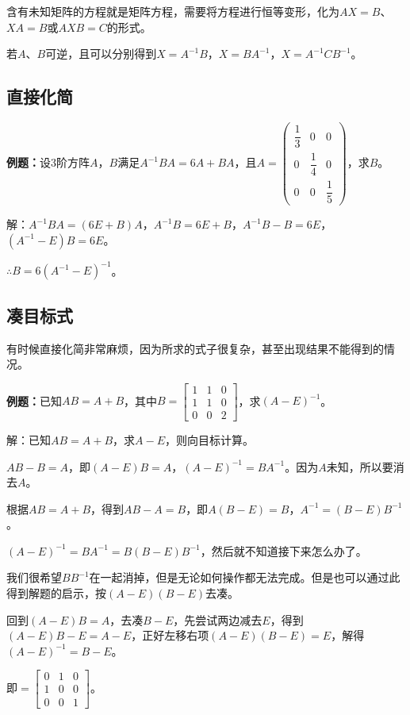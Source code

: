 \documentclass[UTF8, 12pt]{ctexart}
\begin{document}
含有未知矩阵的方程就是矩阵方程，需要将方程进行恒等变形，化为$AX=B$、$XA=B$或$AXB=C$的形式。

若$A$、$B$可逆，且可以分别得到$X=A^{-1}B$，$X=BA^{-1}$，$X=A^{-1}CB^{-1}$。

\subsection{直接化简}

\textbf{例题：}设3阶方阵$A$，$B$满足$A^{-1}BA=6A+BA$，且$A=\left(\begin{array}{ccc}
    \dfrac{1}{3} & 0 & 0 \\
    0 & \dfrac{1}{4} & 0 \\
    0 & 0 & \dfrac{1}{5}
\end{array}\right)$，求$B$。

解：$A^{-1}BA=(6E+B)A$，$A^{-1}B=6E+B$，$A^{-1}B-B=6E$，$(A^{-1}-E)B=6E$。

$\therefore B=6(A^{-1}-E)^{-1}$。

\subsection{凑目标式}

有时候直接化简非常麻烦，因为所求的式子很复杂，甚至出现结果不能得到的情况。

\textbf{例题：}已知$AB=A+B$，其中$B=\left[\begin{array}{ccc}
    1 & 1 & 0 \\
    1 & 1 & 0 \\
    0 & 0 & 2
\end{array}\right]$，求$(A-E)^{-1}$。

解：已知$AB=A+B$，求$A-E$，则向目标计算。

$AB-B=A$，即$(A-E)B=A$，$(A-E)^{-1}=BA^{-1}$。因为$A$未知，所以要消去$A$。

根据$AB=A+B$，得到$AB-A=B$，即$A(B-E)=B$，$A^{-1}=(B-E)B^{-1}$。

$(A-E)^{-1}=BA^{-1}=B(B-E)B^{-1}$，然后就不知道接下来怎么办了。

我们很希望$BB^{-1}$在一起消掉，但是无论如何操作都无法完成。但是也可以通过此得到解题的启示，按$(A-E)(B-E)$去凑。

回到$(A-E)B=A$，去凑$B-E$，先尝试两边减去$E$，得到$(A-E)B-E=A-E$，正好左移右项$(A-E)(B-E)=E$，解得$(A-E)^{-1}=B-E$。

即$=\left[\begin{array}{ccc}
    0 & 1 & 0 \\
    1 & 0 & 0 \\
    0 & 0 & 1
\end{array}\right]$。
\end{document}
